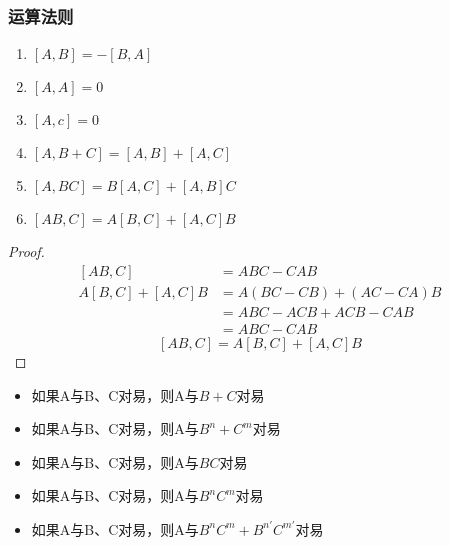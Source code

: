 \begin{frame} 
    \frametitle{运算法则}
    \begin{enumerate}
        \item  $[A,B]=-[B,A]$
        \item  $[A,A]=0$
        \item  $[A,c]=0$
        \item  $[A,B+C]=[A,B]+[A,C]$
        \item  $[A,BC]=B[A,C]+[A,B]C$
        \item  $[AB,C]=A[B,C]+[A,C]B$
    \end{enumerate}
\end{frame} 
\begin{frame}
    \begin{proof}{}   
        \begin{equation*}
            \begin{split} 
            [AB,C]&=ABC-CAB \\
            A[B,C]+[A,C]B&=A(BC-CB)+(AC-CA)B\\
            &=ABC-ACB+ACB-CAB\\
            &=ABC-CAB
            \end{split}  
        \end{equation*}  
        $$ [AB,C]=A[B,C]+[A,C]B $$
    \end{proof}
\end{frame} 

\begin{frame} 
    \begin{tcolorbox}[colback=yellow!5,colframe=red!75!black,title=推论：]
        \begin{itemize}
            \item 如果A与B、C对易，则A与$B+C$对易
            \item 如果A与B、C对易，则A与$B^n+C^m$对易
            \item 如果A与B、C对易，则A与$BC$对易
            \item 如果A与B、C对易，则A与$B^nC^m$对易
            \item 如果A与B、C对易，则A与$B^nC^m+B^{n'}C^{m'}$对易
        \end{itemize}
    \end{tcolorbox}
\end{frame} 

